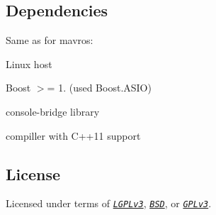\subsection*{Dependencies }

Same as for mavros\+:


\begin{DoxyItemize}
\item Linux host
\item Boost $>$= 1. (used Boost.\+A\+S\+IO)
\item console-\/bridge library
\item compiller with C++11 support
\end{DoxyItemize}

\subsection*{License }

Licensed under terms of \href{https://www.gnu.org/licenses/lgpl.html}{\texttt{ {\itshape L\+G\+P\+Lv3}}}, \href{https://github.com/mavlink/mavros/blob/master/LICENSE-BSD.txt}{\texttt{ {\itshape B\+SD}}}, or \href{https://www.gnu.org/licenses/gpl.html}{\texttt{ {\itshape G\+P\+Lv3}}}. 